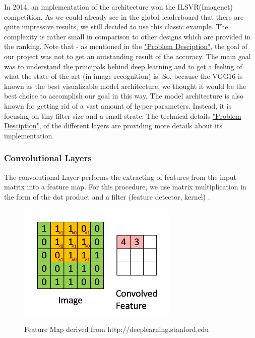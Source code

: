 \documentclass[journal]{IEEEtran}
\begin{document}
In 2014, an implementation of the architecture won the ILSVR(Imagenet) competition. As we could already see in the global leaderboard that there are quite impressive results, we still decided to use this classic example. The complexity is rather small in comparison to other designs which are provided in the ranking. Note that - as  mentioned in the \hyperref[sec:problemDescription]{"Problem Desciption"}, the goal of our project was not to get an outstanding result of the accuracy. The main goal was  to understand the principals behind deep learning and to get a feeling of what the state of the art (in image recognition) is. So, because the VGG16 \cite{RN15} is known as the best visualizable model architecture, we thought it would be the best choice to accomplish our goal in this way. The model architecture is also known for getting rid of a vast amount of hyper-parameters. Instead, it is focusing on tiny filter size and a small strate. The technical details \hyperref[sec:techDetails]{"Problem Desciption"}, of the different layers are providing more details about its implementation. 
\subsubsection{Convolutional Layers}
\noindent The convolutional Layer performs the extracting of features from the input matrix into a feature map. For this procedure, we use matrix multiplication in the form of the dot product and a filter (feature detector, kernel) \cite{Goodfellow-et-al-2016}. 

\begin{figure}
  \begin{center}
  \includegraphics[width=3in]{photo/cnn.png}\\
  \caption{Feature Map derived from http://deeplearning.stanford.edu}\label{featuremap}
  \end{center}
\end{figure}
\end{document}
